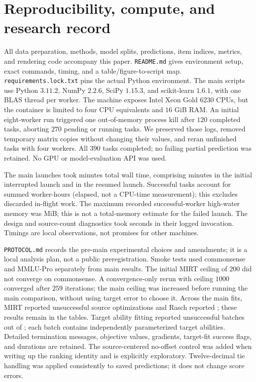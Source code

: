 \documentclass{article}
\begin{document}
\section{Reproducibility, compute, and research record}
\label{app:implementation}
All data preparation, methods, model splits, predictions, item indices, metrics, and rendering code accompany this paper. \texttt{README.md} gives environment setup, exact commands, timing, and a table/figure-to-script map. \texttt{requirements.lock.txt} pins the actual Python environment. The main scripts use Python $3.11.2$, NumPy $2.2.6$, SciPy $1.15.3$, and scikit-learn $1.6.1$, with one BLAS thread per worker. The machine exposes Intel Xeon Gold 6230 CPUs, but the container is limited to four CPU equivalents and $16$ GiB RAM. An initial eight-worker run triggered one out-of-memory process kill after $120$ completed tasks, aborting $270$ pending or running tasks. We preserved those logs, removed temporary matrix copies without changing their values, and reran unfinished tasks with four workers. All $390$ tasks completed; no failing partial prediction was retained. No GPU or model-evaluation API was used.

The main launches took \MainMinutes{} minutes total wall time, comprising \FailedLaunchMinutes{} minutes in the initial interrupted launch and \MainResumeMinutes{} in the resumed launch. Successful tasks account for \WorkerHours{} summed worker-hours (elapsed, not a CPU-time measurement); this excludes discarded in-flight work. The maximum recorded successful-worker high-water memory was \PeakWorkerMiB{} MiB; this is not a total-memory estimate for the failed launch. The design and source-count diagnostics took \DiagnosticSeconds{} seconds in their logged invocation. Timings are local observations, not promises for other machines.

\texttt{PROTOCOL.md} records the pre-main experimental choices and amendments; it is a local analysis plan, not a public preregistration. Smoke tests used commonsense and MMLU-Pro separately from main results. The initial MIRT ceiling of $200$ did not converge on commonsense. A convergence-only rerun with ceiling $1000$ converged after $259$ iterations; the main ceiling was increased before running the main comparison, without using target error to choose it. Across the main fits, MIRT reported \MirtFailures{} unsuccessful source optimizations and Rasch reported \RaschFailures{}; these results remain in the tables. Target ability fitting reported \TargetFitFailures{} unsuccessful batches out of \TargetFitBatches{}; each batch contains independently parameterized target abilities. Detailed termination messages, objective values, gradients, target-fit success flags, and durations are retained. The source-centered no-offset control was added when writing up the ranking identity and is explicitly exploratory. Twelve-decimal tie handling was applied consistently to saved predictions; it does not change score errors.
\end{document}
